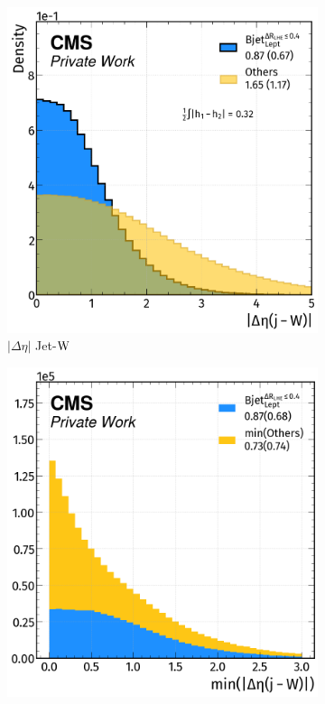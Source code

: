 \begin{figure}[H]
    \ContinuedFloat
    \vspace{-0.5cm}
    \centering
   \begin{subfigure}{0.49\linewidth}
        \centering
        \includegraphics[width=1\linewidth]{fig//chap08-kin_reco/deta_W.png}
        \caption{$|\Delta \eta|$ Jet-${\text{W}}$}
    \end{subfigure}
    \hfill
    \begin{subfigure}{0.4825\linewidth}  
        \centering
        \includegraphics[width=1\linewidth]{fig//chap08-kin_reco/min_deta_W.png}

\end{subfigure}
\end{figure}
